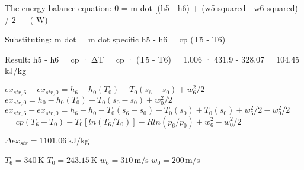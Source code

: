 The energy balance equation:  
0 = m dot [(h5 - h6) + (w5 squared - w6 squared) / 2] + (-W)  

Substituting:  
m dot = m dot specific  
h5 - h6 = cp (T5 - T6)  

Result:  
h5 - h6 = cp · ΔT = cp · (T5 - T6) = 1.006 · 431.9 - 328.07 = 104.45 kJ/kg

\( ex_{str,6} - ex_{str,0} = h_6 - h_0(T_0) - T_0(s_6 - s_0) + w_6^2 / 2 \)  
\( ex_{str,0} = h_0 - h_0(T_0) - T_0(s_0 - s_0) + w_0^2 / 2 \)  
\( ex_{str,6} - ex_{str,0} = h_6 - h_0 - T_0(s_6 - s_0) - T_0(s_0) + T_0(s_0) + w_6^2 / 2 - w_0^2 / 2 \)  
\( = cp(T_6 - T_0) - T_0[ln(T_6 / T_0)] - R ln(p_6 / p_0) + w_6^2 - w_0^2 / 2 \)  

\( \Delta ex_{str} = 1101.06 \, \text{kJ/kg} \)  

\( T_6 = 340 \, \text{K} \)  
\( T_0 = 243.15 \, \text{K} \)  
\( w_6 = 310 \, \text{m/s} \)  
\( w_0 = 200 \, \text{m/s} \)